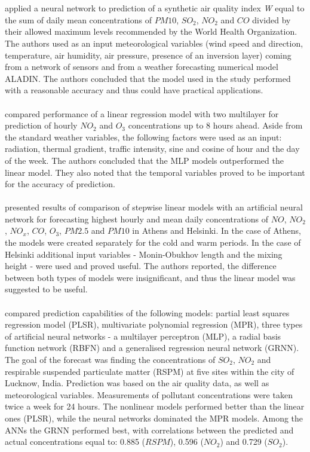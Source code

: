 \\\\
\cite{LOZOWICKA2005} applied a neural network to prediction of a synthetic air quality index \textit{W} equal to the sum of daily mean concentrations of $PM10$, $SO_2$, $NO_2$ and $CO$ divided by their allowed maximum levels recommended by the World Health Organization. The authors used as an input meteorological variables (wind speed and direction, temperature, air humidity, air pressure, presence of an inversion layer) coming from a network of sensors and from a weather forecasting numerical model ALADIN. The authors concluded that the model used in the study performed with a reasonable accuracy and thus could have practical applications.
\\\\
\cite{AGIRREBASURKO2006430} compared performance of a linear regression model with two multilayer for prediction of hourly $NO_2$ and $O_3$ concentrations up to 8 hours ahead. Aside from the standard weather variables, the following factors were used as an input: radiation, thermal gradient, traffic intensity, sine and cosine of hour and the day of the week. The authors concluded that the MLP models outperformed the linear model. They also noted that the temporal variables proved to be important for the accuracy of prediction. 
\\\\
\cite{VLACHOGIANNI20111559} presented results of comparison of stepwise linear models with an artificial neural network for forecasting highest hourly and mean daily concentrations of $NO$, $NO_2$, $NO_x$, $CO$, $O_3$, $PM2.5$ and $PM10$ in Athens and Helsinki. In the case of Athens, the models were created separately for the cold and warm periods. In the case of Helsinki additional input variables - Monin-Obukhov length and the mixing height - were  used and proved useful. The authors reported, the difference between both types of models were insignificant, and thus the linear model was suggested to be useful.
\\\\
\cite{SINGH2012244} compared prediction capabilities of the following models: partial least squares regression model (PLSR), multivariate polynomial regression (MPR), three types of artificial neural networks - a multilayer perceptron (MLP), a radial basis function network (RBFN) and a generalised regression neural network (GRNN). The goal of the forecast was finding the concentrations of $SO_2$, $NO_2$ and respirable suspended particulate matter (RSPM) at five sites within the city of Lucknow, India. Prediction was based on the air quality data, as well as meteorological variables. Measurements of pollutant concentrations were taken twice a week for 24 hours. The nonlinear models performed better than the linear ones (PLSR), while the neural networks dominated the MPR models. Among the ANNs the GRNN performed best, with correlations between the predicted and actual concentrations equal to: 0.885 ($RSPM$), 0.596 ($NO_2$) and 0.729 ($SO_2$).
